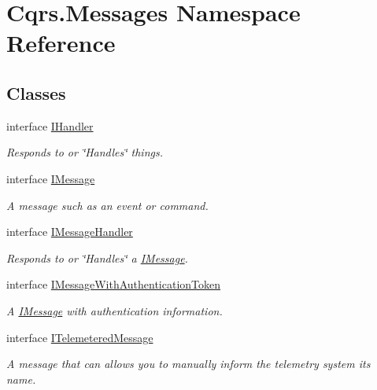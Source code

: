 \hypertarget{namespaceCqrs_1_1Messages}{}\section{Cqrs.\+Messages Namespace Reference}
\label{namespaceCqrs_1_1Messages}
\subsection*{Classes}
\begin{DoxyCompactItemize}
\item 
interface \hyperlink{interfaceCqrs_1_1Messages_1_1IHandler}{I\+Handler}
\begin{DoxyCompactList}\small\item\em Responds to or \char`\"{}\+Handles\char`\"{} things. \end{DoxyCompactList}\item 
interface \hyperlink{interfaceCqrs_1_1Messages_1_1IMessage}{I\+Message}
\begin{DoxyCompactList}\small\item\em A message such as an event or command. \end{DoxyCompactList}\item 
interface \hyperlink{interfaceCqrs_1_1Messages_1_1IMessageHandler}{I\+Message\+Handler}
\begin{DoxyCompactList}\small\item\em Responds to or \char`\"{}\+Handles\char`\"{} a \hyperlink{interfaceCqrs_1_1Messages_1_1IMessage}{I\+Message}. \end{DoxyCompactList}\item 
interface \hyperlink{interfaceCqrs_1_1Messages_1_1IMessageWithAuthenticationToken}{I\+Message\+With\+Authentication\+Token}
\begin{DoxyCompactList}\small\item\em A \hyperlink{interfaceCqrs_1_1Messages_1_1IMessage}{I\+Message} with authentication information. \end{DoxyCompactList}\item 
interface \hyperlink{interfaceCqrs_1_1Messages_1_1ITelemeteredMessage}{I\+Telemetered\+Message}
\begin{DoxyCompactList}\small\item\em A message that can allows you to manually inform the telemetry system it\textquotesingle{}s name. \end{DoxyCompactList}\end{DoxyCompactItemize}
